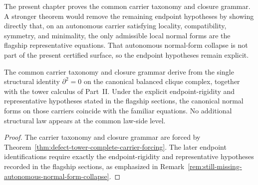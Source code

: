 \begin{remark}
\label{rem:still-missing-autonomous-normal-form-collapse}
The present chapter proves the common carrier taxonomy and closure grammar. A
stronger theorem would remove the remaining endpoint hypotheses by showing
directly that, on an autonomous carrier satisfying locality, compatibility,
symmetry, and minimality, the only admissible local normal forms are the
flagship representative equations. That autonomous normal-form collapse is not
part of the present certified surface, so the endpoint hypotheses remain
explicit.
\end{remark}

\begin{corollary}
\label{cor:single-source}
The common carrier taxonomy and closure grammar derive from the single
structural identity \(\partial^2=0\) on the canonical balanced clique complex,
together with the tower calculus of Part~II. Under the explicit
endpoint-rigidity and representative hypotheses stated in the flagship
sections, the canonical normal forms on those carriers coincide with the
familiar equations. No additional structural law appears at the common
law-side level.
\end{corollary}

\begin{proof}
The carrier taxonomy and closure grammar are forced by
Theorem~\ref{thm:defect-tower-complete-carrier-forcing}. The later endpoint
identifications require exactly the endpoint-rigidity and representative
hypotheses recorded in the flagship sections, as emphasized in
Remark~\ref{rem:still-missing-autonomous-normal-form-collapse}.
\end{proof}

